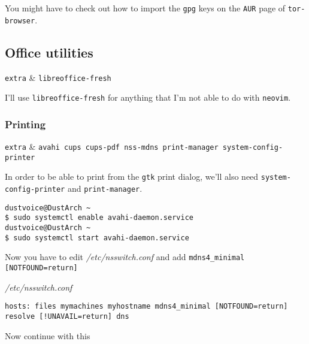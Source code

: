 \documentclass[10pt]{dustdoc}
\begin{document}
\begin{NOTE}
    You might have to check out how to import the \texttt{gpg} keys on the \texttt{AUR} page of \texttt{tor-browser}.
\end{NOTE}

\subsection{Office utilities}
\label{sec:office-utilities}

\begin{packagetable}
    \texttt{extra} & \texttt{libreoffice-fresh} \\
\end{packagetable}

I’ll use \texttt{libreoffice-fresh} for anything that I’m not able to do with \texttt{neovim}.

\subsubsection{Printing}
\label{sec:printing}

\begin{packagetable}
    \texttt{extra} & \texttt{avahi cups cups-pdf nss-mdns print-manager system-config-printer} \\
\end{packagetable}

In order to be able to print from the \texttt{gtk} print dialog, we’ll also need \texttt{system-config-printer} and \texttt{print-manager}.

\begin{verbatim}
dustvoice@DustArch ~
$ sudo systemctl enable avahi-daemon.service
dustvoice@DustArch ~
$ sudo systemctl start avahi-daemon.service
\end{verbatim}

Now you have to edit \textit{/etc/nsswitch.conf} and add\newline
\texttt{mdns4\_minimal [NOTFOUND=return]}

\begin{mintedlisting}
    \caption*{\textit{/etc/nsswitch.conf}}
    \begin{verbatim}
hosts: files mymachines myhostname mdns4_minimal [NOTFOUND=return] resolve [!UNAVAIL=return] dns
    \end{verbatim}
\end{mintedlisting}

Now continue with this
\end{document}
